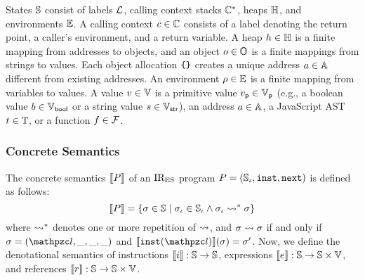 States $\mathbb{S}$ consist of labels $\mathcal{L}$, calling context stacks
$\mathbb{C}^*$, heaps $\mathbb{H}$, and environments $\mathbb{E}$.  A calling context
$c \in \mathbb{C}$ consists of a label denoting the return point, a caller's
environment, and a return variable.  A heap $h \in \mathbb{H}$ is a finite
mapping from addresses to objects, and an object $o \in \mathbb{O}$ is a finite
mappings from strings to values.  Each object allocation $\texttt{\{} \texttt{\}}$ creates a
unique address $a \in \mathbb{A}$ different from existing addresses.  An
environment $\rho \in \mathbb{E}$ is a finite mapping from variables to values. A
value $v \in \mathbb{V}$ is a primitive value $v_{\textsf{p}} \in \mathbb{V}_{\textsf{p}}$ (e.g., a
boolean value $b \in \mathbb{V}_{\textsf{bool}}$ or a string value $s \in \mathbb{V}_{\textsf{str}}$), an
address $a \in \mathbb{A}$, a JavaScript AST $t \in \mathbb{T}$, or a
function $f \in \mathcal{F}$.

\subsubsection{Concrete Semantics}

The concrete semantics $\llbracket{P}\rrbracket$ of an $\text{IR}_\text{ES}$ program $P = (\mathbb{S}_\iota, \texttt{inst},
\texttt{next})$ is defined as follows:
\[
  \llbracket{P}\rrbracket = \{ \sigma \in \mathbb{S} \mid \sigma_\iota \in \mathbb{S}_\iota \wedge \sigma_\iota \leadsto^* \sigma \}
\]
where $\leadsto^*$ denotes one or more repetition of $\leadsto$, and $\sigma \leadsto
\sigma$ if and only if $\st = (\lab, \_, \_, \_)$ and $\sem{\getinst(\lab)}(\st) =
\st'$. Now, we define the denotational semantics of instructions $\llbracket{i}\rrbracket:
\mathbb{S} \rightarrow \mathbb{S}$, expressions $\llbracket{e}\rrbracket: \mathbb{S} \rightarrow \mathbb{S}
\times \mathbb{V}$, and references $\llbracket{r}\rrbracket: \mathbb{S} \rightarrow \mathbb{S} \times
\mathbb{V}$.


